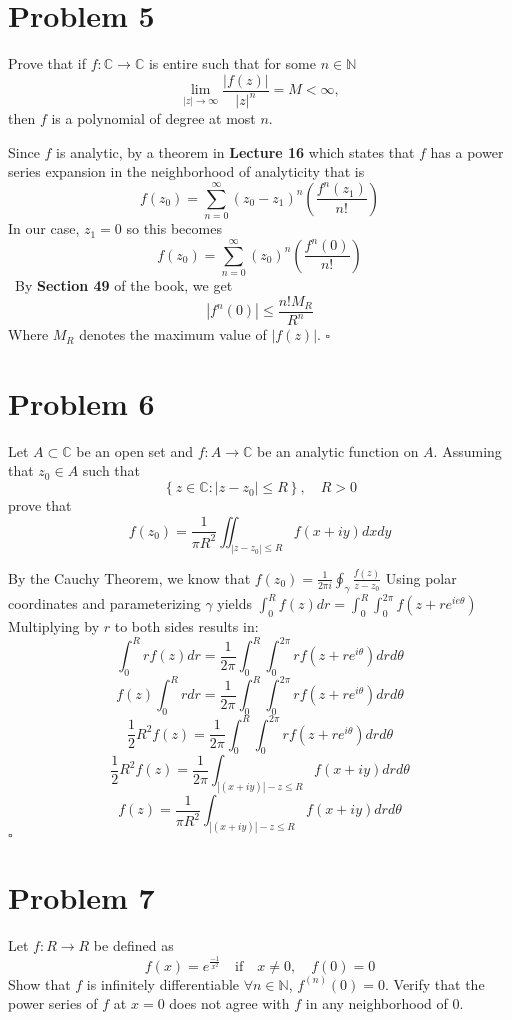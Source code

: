 \documentclass[12pt]{article}
\newcommand{\N}{\mathbb{N}}
\newcommand{\C}{\mathbb{C}}
\newcommand{\set}[1]{\left\{ #1\right\}}
\newenvironment{proof}{\noindent{\bf Proof.}}{\hfill $\square$\medskip}
\begin{document}
\section{Problem 5}
Prove that if $f:\C\rightarrow\C$ is entire such that for some $n\in\N$
$$\lim_{\left |z\right |\to\infty}\frac{\left |f(z)\right |}{\left |z\right |^{n}}=M<\infty,$$
then $f$ is a polynomial of degree at most $n$.

\begin{proof}
    Since $f$ is analytic, by a theorem in \textbf{Lecture 16} which states that $f$ has a
    power series expansion in the neighborhood of analyticity that is
    $$f(z_{0})=\sum_{n=0}^{\infty}(z_{0}-z_{1})^{n}\left(\frac{f^{n}(z_{1})}{n!}\right)$$
    In our case, $z_{1}=0$ so this becomes
    $$f(z_{0})=\sum_{n=0}^{\infty}(z_{0})^{n}\left(\frac{f^{n}(0)}{n!}\right)$$\
    By \textbf{Section 49} of the book, we get
    $$\left|f^{n}(0)\right|\leq \frac{n! M_{R}}{R^{n}}$$
    Where $M_{R}$ denotes the maximum value of $\left|f(z)\right|$.
\end{proof}


\newpage
\section{Problem 6}
Let $A\subset \C$ be an open set and $f:A\to\C$ be an analytic function on $A$. Assuming that $z_{0}\in A$ such that
$$\set{z\in\C:\left |z-z_{0}\right |\leq R},\quad R>0$$
prove that
$$f(z_{0})=\frac{1}{\pi R^{2}}\iint_{\left |z-z_{0}\right|\leq R}f(x+iy)dxdy$$

\begin{proof}
    By the Cauchy Theorem, we know that $f(z_{0})=\frac{1}{2\pi i}\oint_{\gamma}\frac{f(z)}{z-z_{0}}$
    Using polar coordinates and parameterizing $\gamma$ yields
    $\int_{0}^{R}f(z)dr=\int_{0}^{R}\int_{0}^{2\pi}f(z+re^{ie\theta})$
    Multiplying by $r$ to both sides results in:
    $$\int_{0}^{R}rf(z)dr=\frac{1}{2\pi}\int_{0}^{R}\int_{0}^{2\pi}rf(z+re^{i\theta})drd\theta$$
    $$f(z)\int_{0}^{R}rdr=\frac{1}{2\pi}\int_{0}^{R}\int_{0}^{2\pi}rf(z+re^{i\theta})drd\theta$$
    $$\frac{1}{2}R^{2}f(z)=\frac{1}{2\pi}\int_{0}^{R}\int_{0}^{2\pi}rf(z+re^{i\theta})drd\theta$$
    $$\frac{1}{2}R^{2}f(z)=\frac{1}{2\pi}\int_{|(x+iy)|-z\leq R}f(x+iy)drd\theta$$
    $$f(z)=\frac{1}{\pi R^{2}}\int_{|(x+iy)|-z\leq R}f(x+iy)drd\theta$$
\end{proof}


\newpage
\section{Problem 7}
Let $f:R\to R$ be defined as
$$f(x)=e^{\frac{-1}{x^{2}}}\quad\text{if}\quad x\neq 0,\quad f(0)=0$$
Show that $f$ is infinitely differentiable $\forall n\in\N$, $f^{(n)}(0)=0$. Verify that the power series of $f$ at $x=0$ does not agree with $f$ in any neighborhood of $0$.
\end{document}
